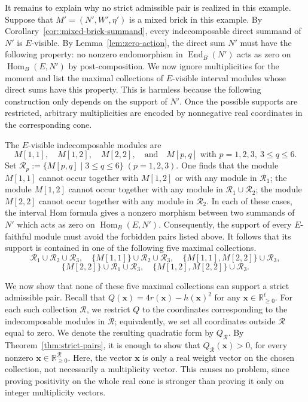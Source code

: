 \documentclass[a4,12pt]{amsart}
\numberwithin{equation}{section} %
\def\Hom{\operatorname{Hom}} %
\def\End{\operatorname{End}} %
\theoremstyle{definition} %
\begin{document}
It remains to explain why no strict admissible pair is realized in this example. Suppose that $M'=(N',W',\eta')$ is a mixed brick in this example. By Corollary~\ref{cor::mixed-brick-summand}, every indecomposable direct summand of $N'$ is $E$-visible. 
By Lemma~\ref{lem:zero-action}, the direct sum $N'$ must have the following property: no nonzero endomorphism in $\End_B(N')$ acts as zero on $\Hom_B(E,N')$ by post-composition. 
We now ignore multiplicities for the moment and list the maximal collections of $E$-visible interval modules whose direct sums have this property. This is harmless because the following construction only depends on the support of $N'$. Once the possible supports are restricted, arbitrary multiplicities are encoded by nonnegative real coordinates in the corresponding cone.

The $E$-visible indecomposable modules are 
\[ 
M[1,1],\quad M[1,2],\quad M[2,2], \quad\text{and}\quad M[p,q]\text{ with }p=1,2,3,\ 3\leq q\leq6. 
\] 
Set $\mathcal{R}_p:=\{M[p,q]\mid 3\leq q\leq6\}\; (p=1,2,3)$. One finds that the module $M[1,1]$ cannot occur together with $M[1,2]$ or with any module in $\mathcal{R}_1$; the module $M[1,2]$ cannot occur together with any module in $\mathcal{R}_1\cup\mathcal{R}_2$; the module $M[2,2]$ cannot occur together with any module in $\mathcal{R}_2$. In each of these cases, the interval Hom formula gives a nonzero morphism between two summands of $N'$ which acts as zero on $\Hom_B(E,N')$. Consequently, the support of every $E$-faithful module must avoid the forbidden pairs listed above. It follows that its support is contained in one of the following five maximal collections.
\[
\mathcal{R}_1\cup\mathcal{R}_2\cup\mathcal{R}_3, \quad \{M[1,1]\}\cup\mathcal{R}_2\cup\mathcal{R}_3,\quad \{M[1,1],M[2,2]\}\cup\mathcal{R}_3,
\]
\[
\{M[2,2]\}\cup\mathcal{R}_1\cup\mathcal{R}_3,\quad \{M[1,2],M[2,2]\}\cup\mathcal{R}_3.
\]

We now show that none of these five maximal collections can support a strict admissible pair. 
Recall that $Q(\mathbf{x})=4r(\mathbf{x})-h(\mathbf{x})^2$ for any $\mathbf{x}\in \mathbb{R}_{\geq 0}^t$. 
For each such collection $\mathcal{R}$, we restrict $Q$ to the coordinates corresponding to the indecomposable modules in $\mathcal{R}$; equivalently, we set all coordinates outside $\mathcal{R}$ equal to zero. 
We denote the resulting quadratic form by $Q_{\mathcal{R}}$. 
By Theorem~\ref{thm:strict-pairs}, it is enough to show that $Q_{\mathcal{R}}(\mathbf{x})>0$, for every nonzero $\mathbf{x}\in\mathbb{R}_{\geq 0}^{\mathcal{R}}$. Here, the vector $\mathbf{x}$ is only a real weight vector on the chosen collection, not necessarily a multiplicity vector. 
This causes no problem, since proving positivity on the whole real cone is stronger than proving it only on integer multiplicity vectors.
\end{document}
